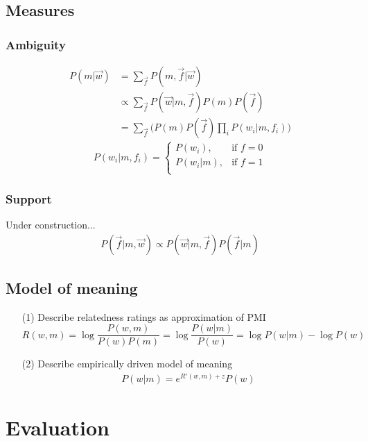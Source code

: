 \documentclass[10pt,letterpaper]{article}
\begin{document}
\subsection{Measures}
\subsubsection{Ambiguity} \begin{align}
P(m | \vec w) &= \sum_{\vec f} P(m, \vec f | \vec w) \\
&\propto \sum_{\vec f} P(\vec w | m, \vec f) P(m) P(\vec f) \\
&= \sum_{\vec f} \bigg (P(m)P(\vec f)\prod_i P(w_i | m, f_i) \bigg)
\end{align}
\[
    P(w_i | m, f_i) = 
\begin{cases}
    P(w_i),& \text{if } f=0\\
    P(w_i | m), &\text{if } f=1\\
\end{cases}
\]
\subsubsection{Support}
Under construction... 
\begin{align}
P(\vec f | m, \vec w) \propto P(\vec w | m, \vec f) P(\vec f | m)
\end{align}

\subsection{Model of meaning}
\begin{itemize}
\item[(1)] Describe relatedness ratings as approximation of PMI
$$
R(w, m)= {\log \frac{P(w, m)}{P(w)P(m)}} = \log \frac{P(w | m)}{P(w)} = \log P(w | m) - \log P(w)
$$
\item[(2)] Describe empirically driven model of meaning
\begin{align}
P(w | m) = e^{R'(w, m) + z} P(w)
\end{align}
\end{itemize}

\section{Evaluation}
\end{document}
